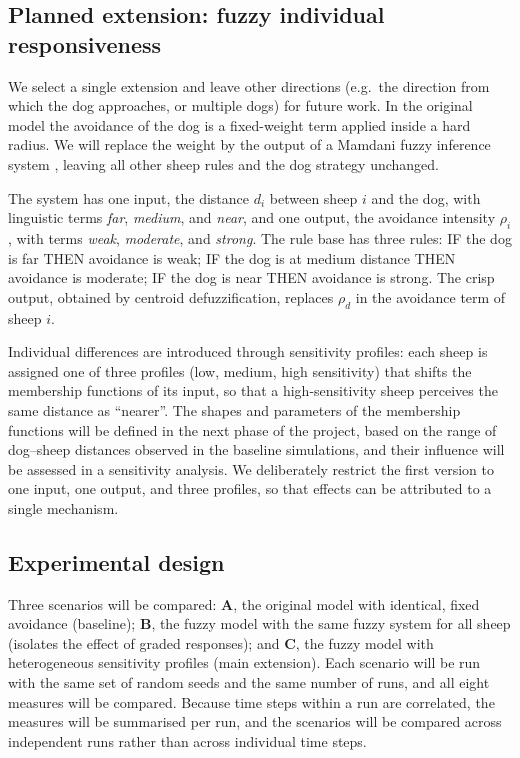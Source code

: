 \documentclass[9pt,twoside]{pnas-new}
\begin{document}
\subsection{Planned extension: fuzzy individual responsiveness}
We select a single extension and leave other directions (e.g.\ the direction from which the dog approaches, or multiple dogs) for future work. In the original model the avoidance of the dog is a fixed-weight term applied inside a hard radius. We will replace the weight by the output of a Mamdani fuzzy inference system \cite{zadeh1965,mamdani1975}, leaving all other sheep rules and the dog strategy unchanged.

The system has one input, the distance $d_i$ between sheep $i$ and the dog, with linguistic terms \emph{far}, \emph{medium}, and \emph{near}, and one output, the avoidance intensity $\rho_i$, with terms \emph{weak}, \emph{moderate}, and \emph{strong}. The rule base has three rules: IF the dog is far THEN avoidance is weak; IF the dog is at medium distance THEN avoidance is moderate; IF the dog is near THEN avoidance is strong. The crisp output, obtained by centroid defuzzification, replaces $\rho_d$ in the avoidance term of sheep $i$.

Individual differences are introduced through sensitivity profiles: each sheep is assigned one of three profiles (low, medium, high sensitivity) that shifts the membership functions of its input, so that a high-sensitivity sheep perceives the same distance as ``nearer''. The shapes and parameters of the membership functions will be defined in the next phase of the project, based on the range of dog--sheep distances observed in the baseline simulations, and their influence will be assessed in a sensitivity analysis. We deliberately restrict the first version to one input, one output, and three profiles, so that effects can be attributed to a single mechanism.

\subsection{Experimental design}
Three scenarios will be compared: \textbf{A}, the original model with identical, fixed avoidance (baseline); \textbf{B}, the fuzzy model with the same fuzzy system for all sheep (isolates the effect of graded responses); and \textbf{C}, the fuzzy model with heterogeneous sensitivity profiles (main extension). Each scenario will be run with the same set of random seeds and the same number of runs, and all eight measures will be compared. Because time steps within a run are correlated, the measures will be summarised per run, and the scenarios will be compared across independent runs rather than across individual time steps. 
\end{document}
